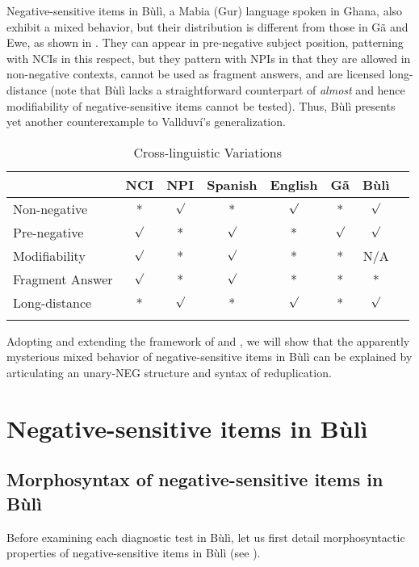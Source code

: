 \documentclass[output=paper,colorlinks,citecolor=brown]{langscibook}
\begin{document}
Negative-sensitive items in Bùlì, a Mabia (Gur) language spoken in Ghana, also exhibit a mixed behavior, but their distribution is different from those in G\~a and Ewe, as shown in  . They can appear in pre-negative subject position, patterning with NCIs in this respect, but they pattern with NPIs in that they are allowed in non-negative contexts, cannot be used as fragment answers, and are licensed long-distance (note that Bùlì lacks a straightforward counterpart of \textit{almost} and hence  modifiability of negative-sensitive items cannot be tested).  Thus, Bùlì presents yet another counterexample to Vallduví's generalization.


\begin{table}
  \begin{tabularx}{\textwidth}{lccccccl}
\lspbottomrule
 & NCI & NPI  &  Spanish &  English  & G\~a &  Bùlì    \\
   \midrule
 Non-negative & *  & $\surd$ & * &  $\surd$ &   *  & $\surd$  \\
Pre-negative &  $\surd$ & * & $\surd$ &   * &  $\surd$ &   $\surd$ \\
Modifiability & $\surd$  & *  & $\surd$ & *    &   * &  N/A \\
Fragment Answer & $\surd$ & *  & $\surd$ & * &  * &  *  \\
Long-distance & *  & $\surd$  & * & $\surd$   &  * & $\surd$  \\
\lspbottomrule
  \end{tabularx}
  \caption{Cross-linguistic Variations} \label{nci-npi2}
\end{table}


Adopting and extending the framework of \cite{CollinsPostal2014} and \cite{CollinsEtAl2017},  we will show that the apparently mysterious mixed behavior of negative-sensitive items in Bùlì can be explained by articulating an unary-NEG structure and  syntax of reduplication.


\section{Negative-sensitive items in Bùlì}

\subsection{Morphosyntax of negative-sensitive items in Bùlì}

Before examining each diagnostic test in Bùlì, let us first detail morphosyntactic properties of negative-sensitive items in Bùlì (see \citealt{Akanlig-Pare2005, Akanlig-Pare2014}).
\end{document}
